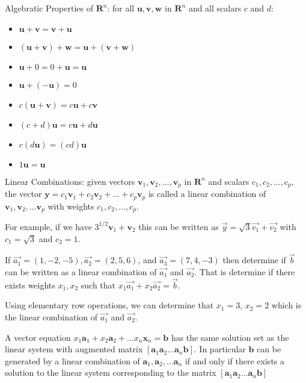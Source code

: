 \documentclass[../linalg.tex]{subfiles}
\begin{document}
Algebratic Properties of $\textbf{R}^n$: for all $\textbf{u}, \textbf{v}, \textbf{w}$ in $\textbf{R}^n$ and all scalars $c$ and $d$:
\begin{itemize}
    \item $\textbf{u}+\textbf{v}=\textbf{v}+\textbf{u}$
    \item $(\textbf{u}+\textbf{v})+\textbf{w}=\textbf{u}+(\textbf{v}+\textbf{w})$
    \item $\textbf{u}+0=0+\textbf{u}=\textbf{u}$
    \item $\textbf{u}+(-\textbf{u})=0$
    \item $c(\textbf{u}+\textbf{v})=c\textbf{u}+c\textbf{v}$
    \item $(c+d)\textbf{u}=c\textbf{u}+d\textbf{u}$
    \item $c(d\textbf{u})=(cd)\textbf{u}$
    \item $1\textbf{u}=\textbf{u}$
\end{itemize}

Linear Combinations: given vectors $\textbf{v}_1,\textbf{v}_2,\dots,\textbf{v}_p$ in $\textbf{R}^n$ and scalars 
$c_1,c_2,\dots, c_p$, the vector $\textbf{y}=c_1\textbf{v}_1+c_2\textbf{v}_2+\dots+c_p\textbf{v}_p$ is called a linear combination of 
$\textbf{v}_1,\textbf{v}_2,\dots \textbf{v}_p$ with weights $c_1,c_2,\dots, c_p$.

For example, if we have $3^{1/2}\textbf{v}_1+\textbf{v}_2$ this can be written as $\vec{y}=\sqrt{3}\vec{v_1}+\vec{v_2}$ with $c_1=\sqrt{3}$ and $c_2=1$.

\begin{example}
    If $\vec{a_1}=(1,-2,-5), \vec{a_2}=(2,5,6)$, and $\vec{a_3}=(7,4,-3)$ then determine if $\vec{b}$ can be written as a linear combination of $\vec{a_1}$ and $\vec{a_2}$. That is determine if there exists weights $x_1,x_2$ such that $x_1\vec{a_1}+x_2\vec{a_2}=\vec{b}$.

    Using elementary row operations, we can determine that $x_1=3$, $x_2=2$ which is the linear combination of $\vec{a_1}$ and $\vec{a_2}$.

\end{example}

A vector equation $x_1\textbf{a}_1+x_2\textbf{a}_2+\dots x_n\textbf{x}_n=\textbf{b}$ has the same solution set as the linear system with augmented matrix 
$[\textbf{a}_1 \textbf{a}_2 \dots \textbf{a}_n \textbf{b}]$. In particular $\textbf{b}$ can be generated by a linear combination of $\textbf{a}_1,\textbf{a}_2,\dots\textbf{a}_n$ if and only if there exists a solution to the linear system corresponding to the matrix $[\textbf{a}_1 \textbf{a}_2 \dots \textbf{a}_n \textbf{b}]$
\end{document}
